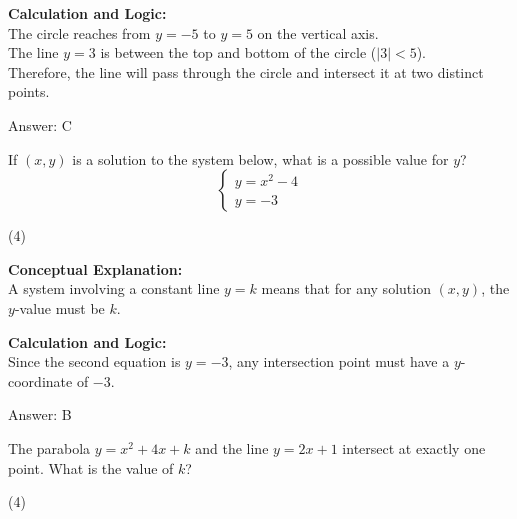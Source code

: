 \documentclass[11pt,paper=a4,answers]{exam}
\begin{document}
\begin{questions}
\begin{solution}
\vspace{20pt}

\textbf{Calculation and Logic:} \\
The circle reaches from $y = -5$ to $y = 5$ on the vertical axis. \\
The line $y = 3$ is between the top and bottom of the circle ($|3| < 5$). \\
Therefore, the line will pass through the circle and intersect it at two distinct points.

\vspace{25pt}

Answer: \colorbox{yellow!100}{C}
\end{solution}

\vspace{40pt}

\question
If $(x, y)$ is a solution to the system below, what is a possible value for $y$?
\[ \begin{cases} y = x^2 - 4 \\ y = -3 \end{cases} \]
\begin{tasks}(4)
\end{tasks}

\begin{solution}
\textbf{Conceptual Explanation:} \\
A system involving a constant line $y = k$ means that for any solution $(x, y)$, the $y$-value must be $k$.

\vspace{20pt}

\textbf{Calculation and Logic:} \\
Since the second equation is $y = -3$, any intersection point must have a $y$-coordinate of $-3$.

\vspace{25pt}

Answer: \colorbox{yellow!100}{B}
\end{solution}

\vspace{40pt}

\question
The parabola $y = x^2 + 4x + k$ and the line $y = 2x + 1$ intersect at exactly one point. What is the value of $k$?
\begin{tasks}(4)
\end{tasks}


\end{questions}
\end{document}
